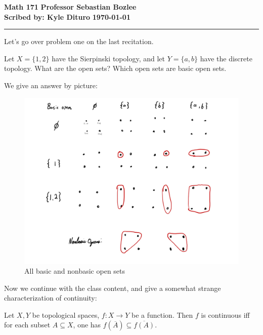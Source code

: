 \documentclass[12pt, twosided]{article}
\begin{document}
\noindent \textbf{Math 171} \hfill \textbf{Professor Sebastian Bozlee} \\
\textbf{Scribed by: Kyle Dituro} \hfill \textbf{\today}\hrule
\vspace{.2in}

Let's go over problem one on the last recitation.

\begin{ques}
  Let \(X = \{1, 2\}\) have the Sierpinski topology, and let \(Y = \{a, b\}\) have the discrete topology. What are the open sets? Which open sets are basic open sets.
\end{ques}

We give an answer by picture:

\begin{figure}[h]
  \centering
  \includegraphics[width=\textwidth]{openchart}
  \caption{All basic and nonbasic open sets}
\end{figure}

Now we continue with the class content, and give a somewhat strange characterization of continuity:

\begin{thm}
  Let \(X, Y\) be topological spaces, \(f: X \to Y\) be a function. Then \(f\) is continuous iff for each subset \(A \subseteq X\), one has \(f(\overline{A}) \subseteq \overline{f(A)}\).
\end{thm}
\end{document}
